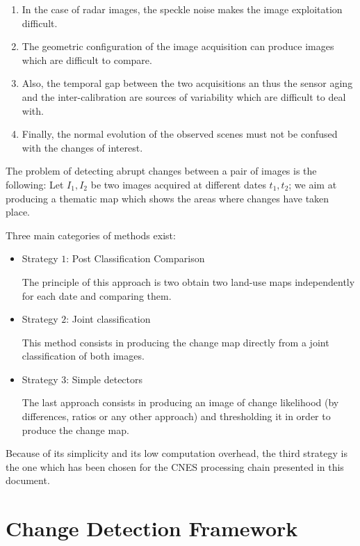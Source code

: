 \begin{enumerate}
\item In the case of radar images, the speckle noise makes the image
  exploitation difficult.
\item The geometric configuration of the image acquisition can produce
  images which are difficult to compare.
\item Also, the temporal gap between the two acquisitions an thus the
  sensor aging and the inter-calibration are sources of variability
  which are difficult to deal with.
\item Finally, the normal evolution of the observed scenes must not be
  confused with the changes of interest.
\end{enumerate}

The problem of detecting abrupt changes between a pair of images is
the following: Let $I_{1},I_{2}$ be two images acquired at different
dates $t_{1},t_{2}$; we aim at producing a thematic map which shows
the areas where changes have taken place.

Three main categories of methods exist:

\begin{itemize}
\item{Strategy $1$: Post Classification Comparison}

The principle of this approach \cite{Deer_1998} is two obtain two
land-use maps independently for each date and comparing them. 



\item{Strategy $2$: Joint classification}

This method consists in producing the change map directly from a joint
classification of both images.

\item{Strategy $3$: Simple detectors}

The last approach consists in producing an image of change likelihood
(by differences, ratios or any other approach) and thresholding it in
order to produce the change map.

\end{itemize}


Because of its simplicity and its low computation overhead, the third
strategy is the one which has been chosen for the CNES processing
chain presented in this document.



\section{Change Detection Framework}
\label{sec:ChangeDetectionFramework}

